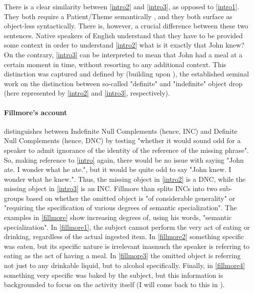 There is a clear similarity between \ref{intro2} and \ref{intro3}, as opposed to \ref{intro1}. They both require a Patient/Theme semantically \parencite[510]{Somers1984}, and they both surface as object-less syntactically. There is, however, a crucial difference between these two sentences. Native speakers of English understand that they have to be provided some context in order to understand \ref{intro2} \textemdash what is it exactly that John knew? On the contrary, \ref{intro3} can be interpreted to mean that John had a meal at a certain moment in time, without resorting to any additional context. This distinction was captured and defined by \textcite{Fillmore1986} (building upon \textcite{fillmore1969types, Allerton1975}), the established seminal work on the distinction between so-called "definite" and "indefinite" object drop (here represented by \ref{intro2} and \ref{intro3}, respectively).

\paragraph{Fillmore's account}
\textcite[96]{Fillmore1986} distinguishes between Indefinite Null Complements (hence, INC) and Definite Null Complements (hence, DNC) by testing "whether it would sound odd for a speaker to admit ignorance of the identity of the reference of the missing phrase". So, making reference to \ref{intro} again, there would be no issue with saying "John ate. I wonder what he ate.", but it would be quite odd to say "John knew. I wonder what he knew.". Thus, the missing object in \ref{intro2} is a DNC, while the missing object in \ref{intro3} is an INC. Fillmore than splits INCs into two sub-groups based on whether the omitted object is "of considerable generality" or "requiring the specification of various degrees of semantic specialization". The examples in \ref{fillmore} \parencite[96-97]{Fillmore1986} show increasing degrees of, using his words, "semantic specialization". In \ref{fillmore1}, the subject cannot perform the very act of eating or drinking, regardless of the actual ingested item. In \ref{fillmore2} something specific was eaten, but its specific nature is irrelevant inasmuch the speaker is referring to eating as the act of having a meal. In \ref{fillmore3} the omitted object is referring not just to any drinkable liquid, but to alcohol specifically. Finally, in \ref{fillmore4} something very specific was baked by the subject, but this information is backgrounded to focus on the activity itself (I will come back to this in ).


